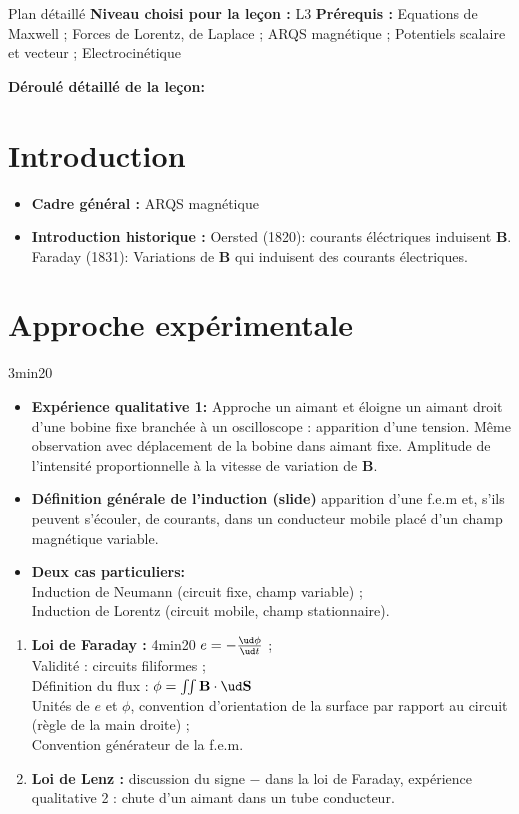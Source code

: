 \begin{reportBlock}{Plan détaillé}
  \textbf{Niveau choisi pour la leçon :} L3
  \newline
  \textbf{Prérequis : } Equations de Maxwell ; Forces de Lorentz, de Laplace ; ARQS magnétique ; Potentiels scalaire et vecteur ; Electrocinétique
  \newline
  
  \textbf{Déroulé détaillé de la leçon: }\newline
  \section*{Introduction} 
  \begin{itemize}
      \item \textbf{Cadre général :} ARQS magnétique
      \item \textbf{Introduction historique :} Oersted (1820): courants éléctriques induisent $\mathbf B$. Faraday (1831): Variations de $\mathbf B$ qui induisent des courants électriques. 
  \end{itemize}
  \vspace{1cm}
  \section{Approche expérimentale} 3min20
  \begin{itemize}
      \item \textbf{Expérience qualitative 1:} Approche un aimant et éloigne un aimant droit d'une bobine fixe branchée à un oscilloscope : apparition d'une tension. Même observation avec déplacement de la bobine dans aimant fixe. Amplitude de l'intensité proportionnelle à la vitesse de variation de $\mathbf B$.
      \item \textbf{Définition générale de l'induction (slide)} apparition d'une f.e.m et, s'ils peuvent s'écouler, de courants, dans un conducteur mobile placé d'un champ magnétique variable.
      \item \textbf{Deux cas particuliers:} \\
      Induction de Neumann (circuit fixe, champ variable) ; \\ Induction de Lorentz (circuit mobile, champ stationnaire).
        \end{itemize}
\begin{enumerate}
      \item \textbf{Loi de Faraday :} 4min20 $e = - \frac{\ud \phi}{\ud t}$ ; \\
      Validité : circuits filiformes ; \\
      Définition du flux : $\phi = \iint \mathbf B \cdot \ud \mathbf S$ \\
      Unités de $e$ et $\phi$, convention d'orientation de la surface par rapport au circuit (règle de la main droite) ; \\ Convention générateur de la f.e.m.
      \item \textbf{Loi de Lenz :} discussion du signe $-$ dans la loi de Faraday, expérience qualitative 2 : chute d'un aimant dans un tube conducteur.
\end{enumerate}


\end{reportBlock}
